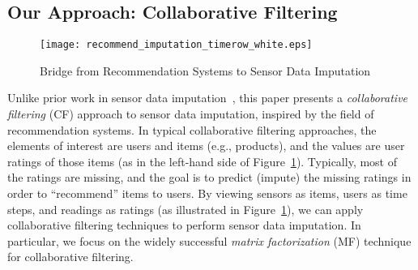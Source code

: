 

\subsection{Our Approach: Collaborative Filtering}

\vspace{-0.5cm}

\begin{figure}[h]
\centering

\texttt{[image: recommend\_imputation\_timerow\_white.eps]}
\vspace{-0.1in}
\caption{Bridge from Recommendation Systems to Sensor Data Imputation} 
\label{recommend_imputation}
\vspace{-0.1in}
\end{figure}

Unlike prior work in sensor data imputation~\cite{Granger:lastseen, le2005estimating, 
Gruenwald:FARM, li2008data, yuan2000multiple, Jian-Zhong:STI, pan2010k,
osborne2012real, beckers2003eof, kondrashov2006spatio}, this paper presents a {\em collaborative filtering} (CF) 
approach to sensor data imputation, inspired by the field of recommendation
systems.  In typical collaborative filtering approaches, the elements of interest are users
and items (e.g., products), and the values are user ratings of those
items (as in the left-hand side of
Figure~\ref{recommend_imputation}).  Typically, most of the ratings
are missing, and the goal is to predict (impute) the missing ratings
in order to ``recommend'' items to users.  By viewing sensors as
items, users as time steps, and readings as ratings (as illustrated in
Figure~\ref{recommend_imputation}), we can apply collaborative filtering
techniques to perform sensor data imputation. 
In particular, we focus on the
widely successful {\em matrix factorization} (MF) technique for collaborative filtering.

